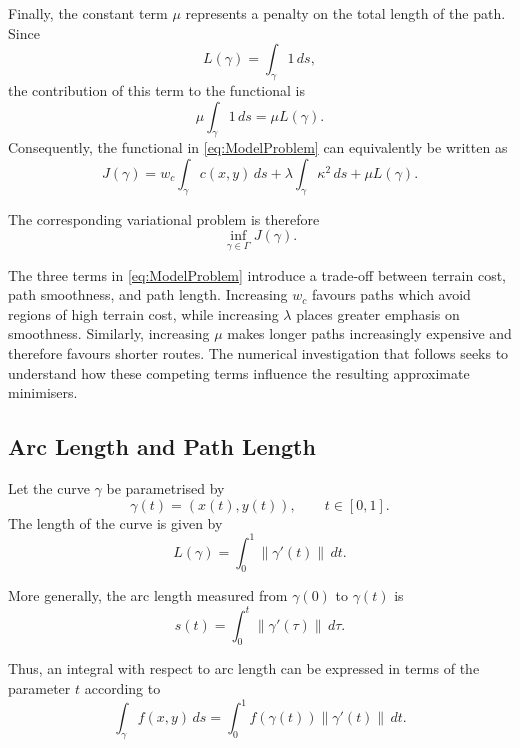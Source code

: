 Finally, the constant term $\mu$ represents a penalty on the total
length of the path. Since
\[
L(\gamma)=\int_\gamma 1\,ds,
\]
the contribution of this term to the functional is
\[
\mu\int_\gamma 1\,ds
=
\mu L(\gamma).
\]
Consequently, the functional in \eqref{eq:ModelProblem} can equivalently
be written as
\begin{equation}
J(\gamma)
=
w_c\int_\gamma c(x,y)\,ds
+
\lambda\int_\gamma\kappa^2\,ds
+
\mu L(\gamma).
\label{eq:expanded_model}
\end{equation}

The corresponding variational problem is therefore
\begin{equation}
\inf_{\gamma\in\Gamma} J(\gamma).
\label{eq:extended_problem}
\end{equation}

The three terms in \eqref{eq:ModelProblem} introduce a trade-off between
terrain cost, path smoothness, and path length. Increasing $w_c$
favours paths which avoid regions of high terrain cost, while increasing
$\lambda$ places greater emphasis on smoothness. Similarly, increasing
$\mu$ makes longer paths increasingly expensive and therefore favours
shorter routes. The numerical investigation that follows seeks to
understand how these competing terms influence the resulting
approximate minimisers.

\subsection{Arc Length and Path Length}
\label{subsec:arc_length}

Let the curve $\gamma$ be parametrised by
\[
\gamma(t)=(x(t),y(t)),
\qquad t\in[0,1].
\]
The length of the curve is given by
\begin{equation}
L(\gamma)
=
\int_0^1
\|\gamma'(t)\|\,dt.
\label{eq:path_length}
\end{equation}

More generally, the arc length measured from $\gamma(0)$ to
$\gamma(t)$ is
\begin{equation}
s(t)
=
\int_0^t
\|\gamma'(\tau)\|\,d\tau.
\label{eq:arc_length}
\end{equation}

Thus, an integral with respect to arc length can be expressed in terms
of the parameter $t$ according to
\begin{equation}
\int_\gamma f(x,y)\,ds
=
\int_0^1
f(\gamma(t))
\|\gamma'(t)\|\,dt.
\label{eq:line_integral}
\end{equation}

